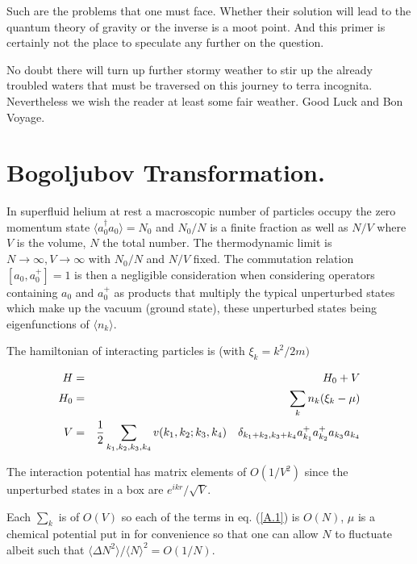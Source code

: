 \documentclass[12pt,oneside]{report}
\begin{document}
Such are the problems that one must face. Whether their
solution will lead to the quantum theory of gravity or 
the inverse is a moot point. And this primer is certainly
not the place to speculate any further on the question.

No doubt there will turn up further stormy weather to
stir up the already troubled waters that must be
traversed on this journey to terra incognita. Nevertheless
we wish the reader at least some fair weather. Good Luck
and Bon Voyage.




\appendix
\chapter{  Bogoljubov Transformation. }\label{appbog}


In superfluid helium at rest a macroscopic number of particles
occupy the zero momentum state $ \langle a_0^{\dagger}a_0 \rangle = N_0 $ and
$ N_0 / N $ is a finite fraction as well as $ N / V $ where $V$ is
the volume, $N$ the total number. The thermodynamic limit is $ N
\to \infty, V \to \infty $ with $ N_0 / N $ and $ N / V $ fixed.
The commutation relation $ [a_0, a_{0}^{+}] = 1 $ is then a
negligible consideration when considering operators containing $
a_0$ and $ a_{0}^{+} $ as products that multiply  the typical
unperturbed states which make up the vacuum (ground state), these
unperturbed states being eigenfunctions of $ \langle n_k \rangle$.


The hamiltonian of interacting particles is (with $  \xi_k = 
k ^{2}/2m)$

\begin{eqnarray}
H & = & H_0 + V \nonumber \\
H_0 & = & \sum_k  n_k  (\xi_k -\mu) \nonumber \\
V & = & {1 \over 2} \sum_{ k_1, k_2, k_3, k_4 } v(k_1, k_2; k_3,
k_4) \quad \delta _{k_1 + k_2, k_3 + k_4} 
	a_{k_1}^{+} a_{k_2}^{+} a_{k_3} a_{k_4} 
 \nonumber \\
\label {A.1} 
\end{eqnarray}


The interaction potential has matrix elements of $ O(1/V^2) $
since the unperturbed states in a box are $ e^{ikr}/ \sqrt V $.

Each $ {\sum_k} $ is of $ O (V) $ so each of the terms in
eq. (\ref{A.1}) is $ O(N)$, $ \mu $ is a chemical potential put in for
convenience so that one can allow $ N $ to fluctuate albeit such
that $ \langle\Delta N^2 \rangle / \langle N \rangle ^2 = O ( 1/N) $.
\end{document}
